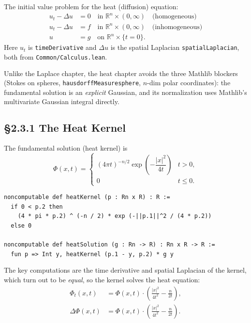 ﻿\documentclass[12pt, a4paper]{article}
\renewcommand{\_}{\origunderscore\allowbreak}
\theoremstyle{definition}
\theoremstyle{plain}
\begin{document}
The initial value problem for the heat (diffusion) equation:
\begin{align}
  u_t - \Delta u &= 0 \quad \text{in } \mathbb{R}^n \times (0,\infty) \quad \text{(homogeneous)} \\
  u_t - \Delta u &= f \quad \text{in } \mathbb{R}^n \times (0,\infty) \quad \text{(inhomogeneous)} \\
  u &= g \quad \text{on } \mathbb{R}^n \times \{t = 0\}.
\end{align}
Here $u_t$ is \texttt{timeDerivative} and $\Delta u$ is the spatial Laplacian
\texttt{spatialLaplacian}, both from \texttt{Common/\allowbreak Calculus.\allowbreak lean}.

Unlike the Laplace chapter, the heat chapter avoids the three Mathlib blockers
(Stokes on spheres, \texttt{hausdorffMeasure\_sphere}, $n$-dim polar coordinates):
the fundamental solution is an \emph{explicit} Gaussian, and its normalization uses
Mathlib's multivariate Gaussian integral directly.

\subsection{§2.3.1 The Heat Kernel}

The fundamental solution (heat kernel) is
\begin{equation}
  \Phi(x, t) =
  \begin{cases}
    (4\pi t)^{-n/2} \exp\!\left(-\dfrac{|x|^2}{4t}\right) & t > 0, \\[1ex]
    0 & t \le 0.
  \end{cases}
\end{equation}

\begin{lstlisting}[caption={Heat kernel definition}]
noncomputable def heatKernel (p : Rn x R) : R :=
  if 0 < p.2 then
    (4 * pi * p.2) ^ (-n / 2) * exp (-||p.1||^2 / (4 * p.2))
  else 0

noncomputable def heatSolution (g : Rn -> R) : Rn x R -> R :=
  fun p => Int y, heatKernel (p.1 - y, p.2) * g y
\end{lstlisting}

The key computations are the time derivative and spatial Laplacian of the kernel,
which turn out to be \emph{equal}, so the kernel solves the heat equation:
\begin{align}
  \Phi_t(x,t) &= \Phi(x,t) \cdot \left(\frac{|x|^2}{4t^2} - \frac{n}{2t}\right), \\
  \Delta \Phi(x,t) &= \Phi(x,t) \cdot \left(\frac{|x|^2}{4t^2} - \frac{n}{2t}\right).
\end{align}
\end{document}
